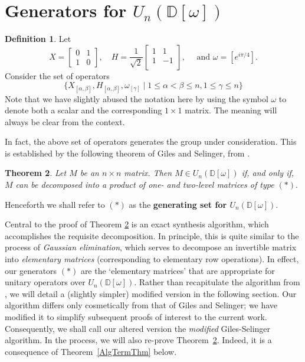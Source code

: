 \documentclass{dalthesis}
\theoremstyle{theorem}
\newtheorem{theorem}{Theorem}
\theoremstyle{definition}
\newtheorem{definition}[theorem]{Definition}
\theoremstyle{definition}  %
\theoremstyle{definition}
\newcommand{\D}{\mathbb{D}}
\newcommand{\Hadamard}{\frac{1}{\sqrt{2}}\left[\begin{array}{rr}
1&1\\
1&-1\\
\end{array}\right]}
\renewcommand{\:}{\mathbin{:}}
\begin{document}
\section{Generators for \texorpdfstring{$U_n(\D[\omega])$}{U^^e2^^82^^99(^^e2^^85^^85[^^cf^^89])}}

\begin{definition}
\label{StarDef}
Let \[
X = \begin{bmatrix}
0&1\\
1&0
\end{bmatrix},\quad H = \Hadamard,\quad\mbox{ and }\omega = \left[e^{i\pi/4}\right].
\]
Consider the set of operators
\begin{equation}
 \{X_{[\alpha,\beta]},H_{[\alpha,\beta]},\omega_{[\gamma]}\mid 1\leq\alpha<\beta\leq n, 1\leq\gamma\leq n\}
\tag{$*$}
\end{equation}
Note that we have slightly abused the notation here by using the symbol $\omega$ to denote both a scalar and the corresponding $1\times 1$ matrix. The meaning will always be clear from the context.
\end{definition}

In fact, the above set of operators generates the group under consideration. This is established by the following theorem of Giles and Selinger, from \cite{GILES-SEL}.

\begin{theorem}
\label{GSDecompThm}
Let $M$ be an $n\times n$ matrix. Then $M\in U_{n}(\D[\omega])$ if, and only if, $M$ can be decomposed into a product of one- and two-level matrices of type $(*).$
\end{theorem}

Henceforth we shall refer to $(*)$ as the \textbf{generating set for $U_{n}(\D[\omega])$}. 

Central to the proof of Theorem \ref{GSDecompThm} is an exact synthesis algorithm, which accomplishes the requisite decomposition. In principle, this is quite similar to the process of \textit{Gaussian elimination}, which serves to decompose an invertible matrix into \textit{elementary matrices} (corresponding to elementary row operations). In effect, our generators $(*)$ are the `elementary matrices' that are appropriate for unitary operators over $U_n(\D[\omega]).$ Rather than recapitulate the algorithm from \cite{GILES-SEL}, we will detail a (slightly simpler) modified version in the following section. Our algorithm differs only cosmetically from that of Giles and Selinger; we have modified it to simplify subsequent proofs of interest to the current work. Consequently, we shall call our altered version the \textit{modified} Giles-Selinger algorithm. In the process, we will also re-prove Theorem~\ref{GSDecompThm}. Indeed, it
is a consequence of Theorem~\ref{AlgTermThm} below.
\end{document}
